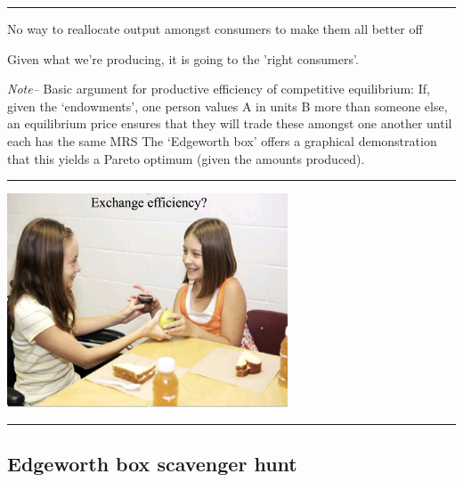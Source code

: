 \documentclass[]{article}
\providecommand{\tightlist}{%
  \setlength{\itemsep}{0pt}\setlength{\parskip}{0pt}}
\begin{document}
\begin{center}\rule{0.5\linewidth}{\linethickness}\end{center}

\begin{description}
\tightlist
\item[Efficiency in consumption (exchange efficiency)]
No way to reallocate output amongst consumers to make them all better off
\end{description}

\bigskip

\bigskip

\begin{centering}

Given what we're producing, it is going to the 'right consumers'.

\end{centering}

\emph{Note--} Basic argument for productive efficiency of competitive equilibrium:
If, given the `endowments', one person values A in units B more than someone else,
an equilibrium price ensures that they will trade these amongst one another until each has the same MRS
The `Edgeworth box' offers a graphical demonstration that this yields a Pareto optimum (given the amounts produced).

\begin{center}\rule{0.5\linewidth}{\linethickness}\end{center}

\includegraphics[height=2.5in]{picsfigs/exchange_efcy.png}

\begin{center}\rule{0.5\linewidth}{\linethickness}\end{center}

\hypertarget{edgeworth-box-scavenger-hunt}{%
\subsection{Edgeworth box scavenger hunt}\label{edgeworth-box-scavenger-hunt}}
\end{document}
